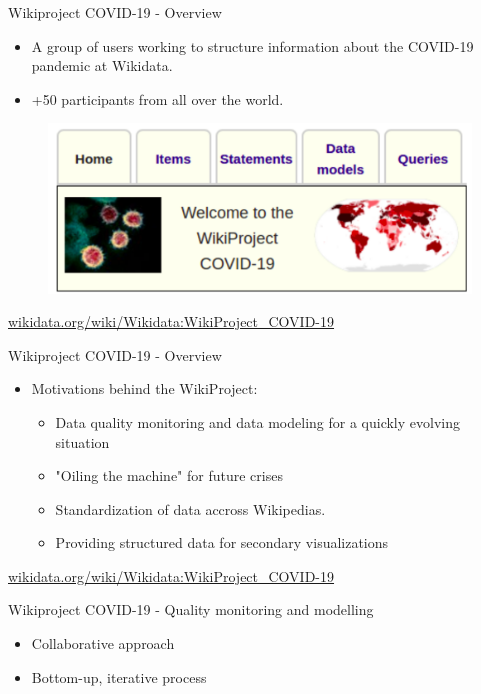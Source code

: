 \documentclass{beamer}
\begin{document}
\begin{frame}{Wikiproject COVID-19 - Overview}

\begin{itemize}
    \item A group of users working to structure information about the COVID-19 pandemic at Wikidata.
    \item +50 participants from all over the world.
\end{itemize}

\begin{figure}
\includegraphics[scale=0.65]{fig/covid_banner.png}
\end{figure}
\vskip 2cm

\url{wikidata.org/wiki/Wikidata:WikiProject_COVID-19}

\end{frame}


\begin{frame}{Wikiproject COVID-19 - Overview}

\begin{itemize}
    \item Motivations behind the WikiProject:
    \begin{itemize}
        \item Data quality monitoring and data modeling for a quickly evolving situation
        \item "Oiling the machine" for future crises
        \item Standardization of data accross Wikipedias. 
        \item Providing structured data for secondary visualizations
    \end{itemize}
\end{itemize}

\url{wikidata.org/wiki/Wikidata:WikiProject_COVID-19}

\end{frame}


\begin{frame}{Wikiproject COVID-19 - Quality monitoring and modelling}
\begin{itemize}
    \item Collaborative approach
    \item Bottom-up, iterative process
\end{itemize}
\end{frame}
\end{document}
